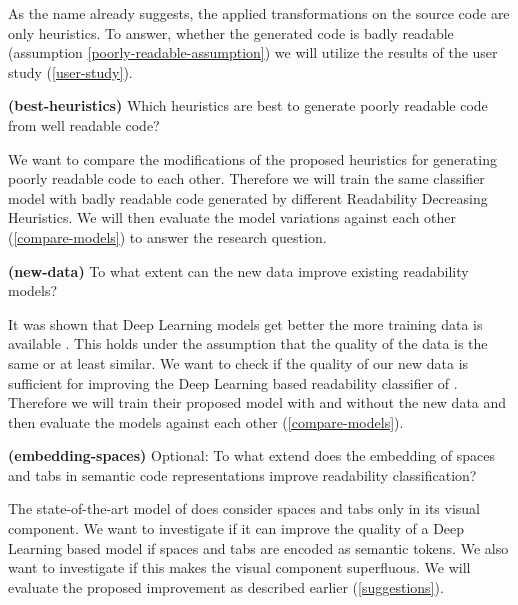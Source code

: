 \documentclass[%
class=scrreprt,
chapterprefix=false,%
open=right,%
twoside=false,%
paper=a4,%
logofile={Logo\_zentral\_farbig\_EN.png},%
thesistype=masterproposal,%
UKenglish,%
]{se2thesis}
\begin{document}
	As the name already suggests, the applied transformations on the source code are only heuristics. To answer, whether the generated code is badly readable (assumption \ref{poorly-readable-assumption}) we will utilize the results of the user study (\ref{user-study}).
	
	\begin{resq} \textbf{(best-heuristics)} Which heuristics are best to generate poorly readable code from well readable code?\end{resq} \label{best-heuristic}
	We want to compare the modifications of the proposed heuristics for generating poorly readable code to each other. Therefore we will train the same classifier model with badly readable code generated by different Readability Decreasing Heuristics. We will then evaluate the model variations against each other (\ref{compare-models}) to answer the research question.
	
	\begin{resq} \textbf{(new-data)} To what extent can the new data improve existing readability models?\end{resq} \label{new-data}
	It was shown that Deep Learning models get better the more training data is available \cite{hestness2017deep}. This holds under the assumption that the quality of the data is the same or at least similar. We want to check if the quality of our new data is sufficient for improving the Deep Learning based readability classifier of \citeauthor{mi2022towards} \cite{mi2022towards}. Therefore we will train their proposed model with and without the new data and then evaluate the models against each other (\ref{compare-models}).
	
	
	\begin{resq} \textbf{(embedding-spaces)} Optional: To what extend does the embedding of spaces and tabs in semantic code representations improve readability classification?\end{resq} \label{embedding-spaces}
	The state-of-the-art model of \citeauthor{mi2022towards} \cite{mi2022towards} does consider spaces and tabs only in its visual component. We want to investigate if it can improve the quality of a Deep Learning based model if spaces and tabs are encoded as semantic tokens. We also want to investigate if this makes the visual component superfluous. We will evaluate the proposed improvement as described earlier (\ref{suggestions}).
	
\end{document}
